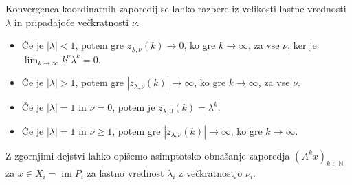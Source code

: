 \documentclass[mat1]{fmfdelo}
\newcommand{\N}{\mathbb N}
\DeclareMathOperator{\Ima}{im}
\begin{document}
Konvergenca koordinatnih zaporedij se lahko razbere iz velikosti lastne vrednosti $\lambda$ in pripadajoče večkratnosti $\nu$.
\begin{itemize}
    \item Če je $|\lambda| < 1$, potem gre $z_{\lambda, \nu} (k) \rightarrow 0$, ko gre $k \rightarrow \infty$, za vse $\nu$, ker je $\lim_{k \rightarrow \infty} k^\nu \lambda^k = 0$.
    \item Če je $|\lambda| > 1$, potem gre $|z_{\lambda, \nu} (k)| \rightarrow \infty$, ko gre $k \rightarrow \infty$, za vse $\nu$.
    \item Če je $|\lambda| = 1$ in $\nu = 0$, potem je $z_{\lambda, 0} (k) = \lambda^k$.
    \item Če je $|\lambda| = 1$ in $\nu \geq 1$, potem gre $|z_{\lambda, \nu} (k)| \rightarrow \infty$, ko gre $k \rightarrow \infty$.
\end{itemize}
Z zgornjimi dejstvi lahko opišemo asimptotsko obnašanje zaporedja $(A^k x)_{k\in\N}$ za $x \in X_i = \Ima P_i$ za lastno vrednost $\lambda_i$ z večkratnostjo $\nu_i$.
\end{document}
